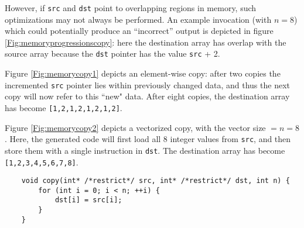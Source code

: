 However, if \texttt{src} and \texttt{dst} point to overlapping regions in memory, such optimizations may not always be performed.
An example invocation (with $n=8$) which could potentially produce an ``incorrect'' output
is depicted in figure \ref{Fig:memoryprogressionscopy}: here the destination array has overlap with the source array
because the \texttt{dst} pointer has the value \texttt{src} + 2.  

Figure \ref{Fig:memorycopy1} depicts an element-wise copy: after two copies
the incremented \texttt{src} pointer lies within previously changed data, and thus the next copy
will now refer to this ``new" data. After eight copies, the destination array has become
\texttt{[1,2,1,2,1,2,1,2]}.

Figure \ref{Fig:memorycopy2} depicts a vectorized copy, with the vector size $= n = 8$.
Here, the generated code will first load all $8$ integer values from \texttt{src}, and
then store them with a single instruction in \texttt{dst}. The destination array has become
\texttt{[1,2,3,4,5,6,7,8]}. 

\newpage

\begin{code}
\begin{verbatim}
    void copy(int* /*restrict*/ src, int* /*restrict*/ dst, int n) {
        for (int i = 0; i < n; ++i) {
            dst[i] = src[i];
        }
    }
\end{verbatim}
\label{Lst:copy}
\end{code}

\vspace*{2em}


